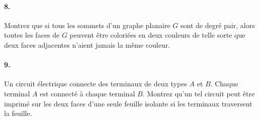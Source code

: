 \paragraph{8. }Montrez que si tous les sommets d’un graphe planaire $G$ sont de degré pair, alors toutes les faces de $G$ peuvent être coloriées en deux couleurs de telle sorte que deux faces adjacentes n’aient jamais la même couleur.

\paragraph{9. } Un circuit électrique connecte des terminaux de deux types $A$ et $B$. Chaque terminal $A$ est connecté à chaque terminal $B$. Montrez qu’un tel circuit peut être imprimé sur les deux faces d’une seule feuille isolante si les terminaux traversent la feuille.
